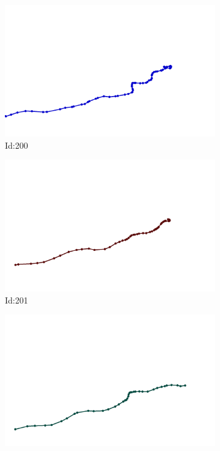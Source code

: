\documentclass[12pt,twoside]{report}
\begin{document}
\begin{figure}
\centering
\begin{subfigure}[b]{0.20\textwidth}
\centering
\includegraphics[width=\textwidth]{../../trajectories/200.png}
\caption{Id:200}
\end{subfigure}
\begin{subfigure}[b]{0.20\textwidth}
\centering
\includegraphics[width=\textwidth]{../../trajectories/201.png}
\caption{Id:201}
\end{subfigure}
\begin{subfigure}[b]{0.20\textwidth}
\centering
\includegraphics[width=\textwidth]{../../trajectories/395.png}

\end{subfigure}
\end{figure}
\end{document}
